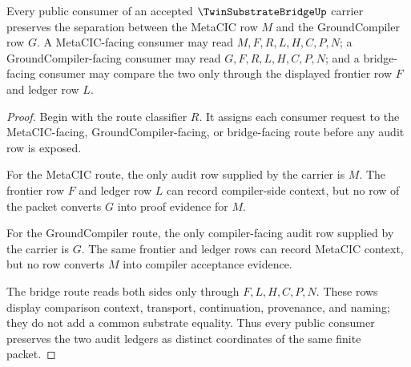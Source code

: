 \begin{theorem}
\label{thm:twin-substrate-bridge-audit-separation}
Every public consumer of an accepted $\TwinSubstrateBridgeUp$ carrier preserves the separation between the MetaCIC row $M$ and the GroundCompiler row $G$. A MetaCIC-facing consumer may read $M,F,R,L,H,C,P,N$; a GroundCompiler-facing consumer may read $G,F,R,L,H,C,P,N$; and a bridge-facing consumer may compare the two only through the displayed frontier row $F$ and ledger row $L$.
\end{theorem}
\begin{proof}
Begin with the route classifier $R$. It assigns each consumer request to the MetaCIC-facing, GroundCompiler-facing, or bridge-facing route before any audit row is exposed.

For the MetaCIC route, the only audit row supplied by the carrier is $M$. The frontier row $F$ and ledger row $L$ can record compiler-side context, but no row of the packet converts $G$ into proof evidence for $M$.

For the GroundCompiler route, the only compiler-facing audit row supplied by the carrier is $G$. The same frontier and ledger rows can record MetaCIC context, but no row converts $M$ into compiler acceptance evidence.

The bridge route reads both sides only through $F,L,H,C,P,N$. These rows display comparison context, transport, continuation, provenance, and naming; they do not add a common substrate equality. Thus every public consumer preserves the two audit ledgers as distinct coordinates of the same finite packet.
\end{proof}


